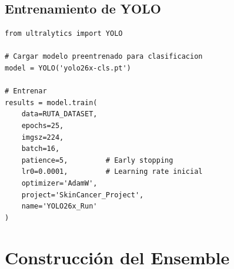\documentclass[12pt,a4paper]{article}
\begin{document}
\subsection{Entrenamiento de YOLO}

\begin{lstlisting}[caption={Entrenamiento de YOLO26x para clasificación}]
from ultralytics import YOLO

# Cargar modelo preentrenado para clasificacion
model = YOLO('yolo26x-cls.pt')

# Entrenar
results = model.train(
    data=RUTA_DATASET,
    epochs=25,
    imgsz=224,
    batch=16,
    patience=5,         # Early stopping
    lr0=0.0001,         # Learning rate inicial
    optimizer='AdamW',
    project='SkinCancer_Project',
    name='YOLO26x_Run'
)
\end{lstlisting}

\section{Construcción del Ensemble}
\end{document}
